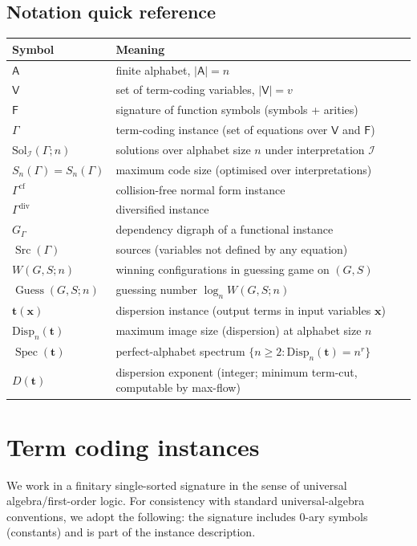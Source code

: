\documentclass[11pt]{article}
\theoremstyle{definition}
\theoremstyle{plain}
\newcommand{\A}{\mathsf{A}}
\newcommand{\Vars}{\mathsf{V}}
\newcommand{\Fun}{\mathsf{F}}
\newcommand{\Sol}{\mathrm{Sol}}
\newcommand{\Disp}{\mathrm{Disp}}
\newcommand{\PerfSpec}{\operatorname{Spec}}
\newcommand{\Sn}{S_n}
\DeclareMathOperator{\Guess}{Guess}
\DeclareMathOperator{\Src}{Src}
\begin{document}
\subsection{Notation quick reference}
\label{sec:notation}
\begin{center}
\begin{tabular}{@{}ll@{}}
\toprule
Symbol & Meaning \\
\midrule
$\A$ & finite alphabet, $|\A|=n$ \\
$\Vars$ & set of term-coding variables, $|\Vars|=v$ \\
$\Fun$ & signature of function symbols (symbols + arities) \\
$\Gamma$ & term-coding instance (set of equations over $\Vars$ and $\Fun$) \\
$\Sol_{\mathcal I}(\Gamma;n)$ & solutions over alphabet size $n$ under interpretation $\mathcal I$ \\
$S_n(\Gamma)=\Sn(\Gamma)$ & maximum code size (optimised over interpretations) \\
$\Gamma^{\mathrm{cf}}$ & collision-free normal form instance \\
$\Gamma^{\mathrm{div}}$ & diversified instance \\
$G_\Gamma$ & dependency digraph of a functional instance \\
$\Src(\Gamma)$ & sources (variables not defined by any equation) \\
$W(G,S;n)$ & winning configurations in guessing game on $(G,S)$ \\
$\Guess(G,S;n)$ & guessing number $\log_n W(G,S;n)$ \\
$\mathbf t(\mathbf x)$ & dispersion instance (output terms in input variables $\mathbf x$) \\
$\Disp_n(\mathbf t)$ & maximum image size (dispersion) at alphabet size $n$ \\
$\PerfSpec(\mathbf t)$ & perfect-alphabet spectrum $\{n\ge2:\Disp_n(\mathbf t)=n^r\}$ \\
$D(\mathbf t)$ & dispersion exponent (integer; minimum term-cut, computable by max-flow) \\
\bottomrule
\end{tabular}
\end{center}

\section{Term coding instances}
\label{sec:tc}

We work in a finitary single-sorted signature in the sense of universal algebra/first-order logic.
For consistency with standard universal-algebra conventions, we adopt the following:
the signature includes $0$-ary symbols (constants) and is part of the instance description.
\end{document}
